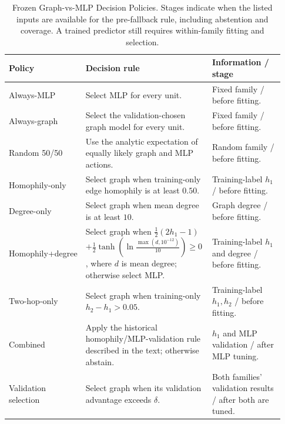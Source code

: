 \begin{table}[htbp]
\centering
\caption{Frozen Graph-vs-MLP Decision Policies. Stages indicate when the listed inputs are available for the pre-fallback rule, including abstention and coverage. A trained predictor still requires within-family fitting and selection.}
\label{tab:diagnostic_policies}
\small
\setlength{\tabcolsep}{3pt}
\begin{tabular}{@{}>{\raggedright\arraybackslash}p{0.20\linewidth}>{\raggedright\arraybackslash}p{0.46\linewidth}>{\raggedright\arraybackslash}p{0.27\linewidth}@{}}
\toprule
Policy & Decision rule & Information / stage \\
\midrule
Always-MLP & Select MLP for every unit. & Fixed family / before fitting. \\
Always-graph & Select the validation-chosen graph model for every unit. & Fixed family / before fitting. \\
Random 50/50 & Use the analytic expectation of equally likely graph and MLP actions. & Random family / before fitting. \\
Homophily-only & Select graph when training-only edge homophily is at least $0.50$. & Training-label $h_1$ / before fitting. \\
Degree-only & Select graph when mean degree is at least $10$. & Graph degree / before fitting. \\
Homophily+\allowbreak degree & Select graph when $\tfrac12(2h_1-1)$\newline $+\tfrac12\tanh\!\left(\ln\!\frac{\max(d,10^{-12})}{10}\right)\geq0$, where $d$ is mean degree; otherwise select MLP. & Training-label $h_1$ and degree / before fitting. \\
Two-hop-only & Select graph when training-only $h_2-h_1>0.05$. & Training-label $h_1,h_2$ / before fitting. \\
Combined & Apply the historical homophily/MLP-validation rule described in the text; otherwise abstain. & $h_1$ and MLP validation / after MLP tuning. \\
Validation selection & Select graph when its validation advantage exceeds $\delta$. & Both families' validation results / after both are tuned. \\
\bottomrule
\end{tabular}
\end{table}
